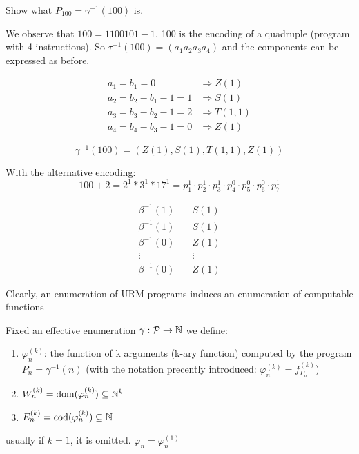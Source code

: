 \begin{example}
  Show what $P_{100} = \gamma^{-1}(100)$ is.

  We observe that $100 = 1100101 - 1$. 100 is the encoding of a
  quadruple (program with 4 instructions). So
  $\tau^{-1}(100) = (a_1 a_2 a_3 a_4)$ and the components can be
  expressed as before.

  \[
    \begin{split}
      a_1 = b_1 = 0 & \Rightarrow Z(1) \\
      a_2 = b_2 - b_1 - 1 = 1 & \Rightarrow S(1) \\
      a_3 = b_3 - b_2 - 1 = 2 & \Rightarrow T(1,1) \\
      a_4 = b_4 - b_3 - 1 = 0 & \Rightarrow Z(1)
    \end{split}
  \]
  
  \[\gamma^{-1}(100) = (Z(1), S(1), T(1,1), Z(1))\]

  With the alternative encoding:
  \[100 + 2 = 2^1 * 3^1 * 17^1 = p_1^1 \cdot p_2^1 \cdot p_3^1 \cdot
    p_4^0 \cdot p_5^0 \cdot p_6^0 \cdot p_7^1 \]

  \[
    \begin{split}
      \beta^{-1}(1) & \quad S(1) \\
      \beta^{-1}(1) & \quad S(1) \\
      \beta^{-1}(0) & \quad Z(1) \\
      \vdots & \quad\vdots \\
      \beta^{-1}(0) & \quad Z(1)
    \end{split}
  \]
\end{example}

Clearly, an enumeration of URM programs induces an enumeration of computable functions

\begin{definition}
  Fixed an effective enumeration
  $\gamma : \mathcal{P} \rightarrow \mathbb{N}$ we define:
  \begin{enumerate}[label=\arabic*.]
  \item $\varphi_n^{(k)}$: the function of k arguments (k-ary
    function) computed by the program $P_n = \gamma^{-1}(n)$ (with
    the notation precently introduced: $\varphi_n^{(k)} = f_{P_n}^{(k)}$)
  \item $W_n^{(k)} = \mbox{dom}(\varphi_n^{(k)}) \subseteq \mathbb{N}^k $
  \item $E_n^{(k)} = \mbox{cod}(\varphi_n^{(k)}) \subseteq \mathbb{N}$
  \end{enumerate}

  usually if $k=1$, it is omitted. $\varphi_n = \varphi_n^{(1)}$
\end{definition}

